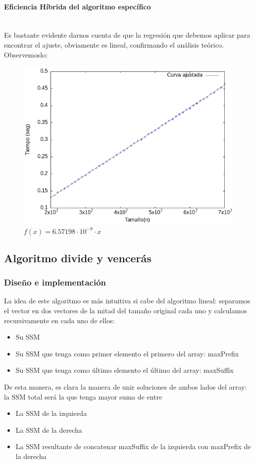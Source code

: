 \documentclass{article}
\newcommand{\myparagraph}[1]{\paragraph{#1}\mbox{}\\}
\begin{document}
\myparagraph{Eficiencia Híbrida del algoritmo específico}
Es bastante evidente darnos cuenta de que la regresión que debemos aplicar para encontrar el ajuste, obviamente es lineal, confirmando el análisis teórico. Observemoslo:
\begin{figure}[!hbt]
    \centering
    \includegraphics[scale=0.7]{P1/regresion.png}
    \caption{\centering $f(x) = 6.57198\cdot 10^{-9} \cdot x$}
\end{figure}

\subsection{Algoritmo divide y vencerás}


\subsubsection{Diseño e implementación} %
La idea de este algoritmo es más intuitiva si cabe del algoritmo 
lineal: separamos el vector en dos vectores de la mitad del tamaño
original cada uno y calculamos recursivamente en cada uno de ellos:
\begin{itemize}
    \item Su SSM
    \item Su SSM que tenga como primer elemento el primero del array: maxPrefix
    \item Su SSM que tenga como último elemento el último del array: maxSuffix
\end{itemize}

De esta manera, es clara la manera de unir soluciones de ambos
lados del array: la SSM total será la que tenga mayor suma de entre 
\begin{itemize}
    \item La SSM de la izquierda
    \item La SSM de la derecha
    \item La SSM resultante de concatenar maxSuffix de la izquierda con maxPrefix de la derecha
\end{itemize}
\end{document}
